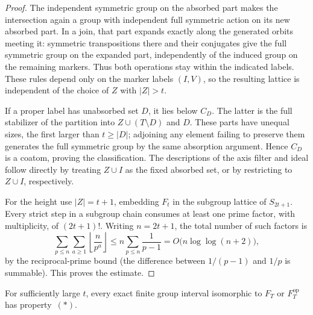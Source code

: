 \begin{proof}
The independent symmetric group on the absorbed part makes the
intersection again a group with independent full symmetric action
on its new absorbed part.  In a join, that part expands exactly
along the generated orbits meeting it: symmetric transpositions
there and their conjugates give the full symmetric group on the
expanded part, independently of the induced group on the remaining
markers.  Thus both operations stay within the indicated labels.
These rules depend only on the marker labels $(I,V)$, so the resulting
lattice is independent of the choice of $Z$ with $|Z|>t$.

If a proper label has unabsorbed set $D$, it lies below $C_D$.
The latter is the full stabilizer of the partition into $Z\cup(T\setminus D)$
and $D$.  These parts have unequal sizes, the first larger than
$t\ge|D|$; adjoining any element failing to preserve them generates
the full symmetric group by the same absorption argument.  Hence
$C_D$ is a coatom, proving the classification.  The descriptions
of the axis filter and ideal follow directly by treating $Z\cup I$
as the fixed absorbed set, or by restricting to $Z\cup I$,
respectively.

For the height use $|Z|=t+1$, embedding $F_t$ in the subgroup lattice
of $S_{2t+1}$.  Every strict step in a subgroup chain consumes at
least one prime factor, with multiplicity, of $(2t+1)!$.
Writing $n=2t+1$, the total number of such factors is
\[
 \sum_{p\le n}\sum_{a\ge1}\left\lfloor\frac{n}{p^a}\right\rfloor
 \le n\sum_{p\le n}\frac1{p-1}
 =O\bigl(n\log\log(n+2)\bigr),
\]
by the reciprocal-prime bound (the difference between $1/(p-1)$
and $1/p$ is summable).  This proves the estimate.
\end{proof}

\begin{lemma}\label{r:marker-normal}
For sufficiently large $t$, every exact finite group interval
isomorphic to $F_T$ or $F_T^{\mathrm{op}}$ has property~\((*)\).
\end{lemma}

